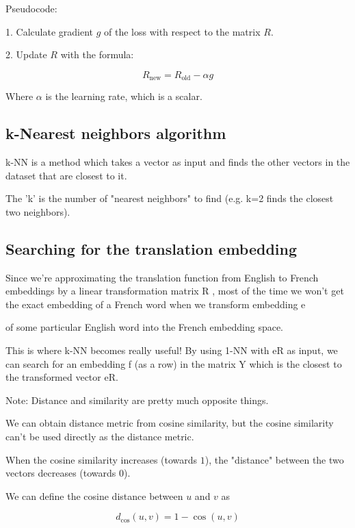 \documentclass[4apaper,12pt]{book}
\begin{document}
\begin{description}
\item  Pseudocode:
\item 1. Calculate gradient $g$ of the loss with respect to the matrix $R$.
\item 2. Update $R$ with the formula:
\item $$R_{\text{new}}= R_{\text{old}}-\alpha g$$
\item Where $\alpha$ is the learning rate, which is a scalar.

  \subsection {k-Nearest neighbors algorithm}
\item k-NN is a method which takes a vector as input and finds the other vectors in the dataset that are closest to it.
\item The 'k' is the number of "nearest neighbors" to find (e.g. k=2 finds the closest two neighbors).

  \subsection{Searching for the translation embedding}

\item Since we're approximating the translation function from English to French embeddings by a linear transformation matrix R
, most of the time we won't get the exact embedding of a French word when we transform embedding e

\item of some particular English word into the French embedding space.

\item This is where k-NN becomes really useful! By using 1-NN with eR as input, we can search for an embedding f (as a row) in the matrix Y which is the closest to the transformed vector eR.

\item  Note: Distance and similarity are pretty much opposite things.
\item We can obtain distance metric from cosine similarity, but the cosine similarity can't be used directly as the distance metric.
\item When the cosine similarity increases (towards $1$), the "distance" between the two vectors decreases (towards $0$).
\item We can define the cosine distance between $u$ and $v$ as
\item $$d_{\text{cos}}(u,v)=1-\cos(u,v)$$


\end{description}
\end{document}
